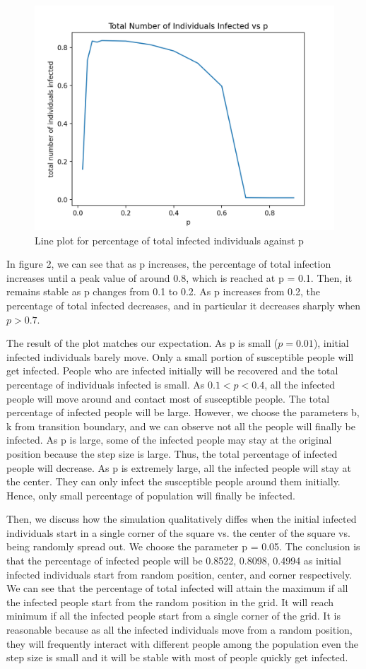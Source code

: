 \documentclass{article}
\begin{document}
\begin{figure}[htp]
\centering
\includegraphics[width=.3\textwidth]{secondspatialplot.png}
\caption{Line plot for percentage of total infected individuals against p}
\label{fig:figure2}

\end{figure}


In figure 2, we can see that as p increases, the percentage of total infection increases until a peak value of around 0.8, which is reached at p = 0.1. Then, it remains stable as p changes from 0.1 to 0.2. As p increases from 0.2, the percentage of total infected decreases, and in particular it decreases sharply when $p > 0.7$.

The result of the plot matches our expectation. As p is small ($p=0.01$), initial infected individuals barely move. Only a small portion of susceptible people will get infected. People who are infected initially will be recovered and the total percentage of individuals infected is small. As $ 0.1<p<0.4 $, all the infected people will move around and contact most of susceptible people. The total percentage of infected people will be large. However, we choose the parameters b, k from transition boundary, and we can observe not all the people will finally be infected. As p is large, some of the infected people may stay at the original position because the step size is large. Thus, the total percentage of infected people will decrease. As p is extremely large, all the infected people will stay at the center. They can only infect the susceptible people around them initially. Hence, only small percentage of population will finally be infected.


Then, we discuss how the simulation qualitatively diffes when the initial infected individuals start in a single corner of the square vs. the center of the square vs. being randomly spread out. We choose the parameter p = 0.05. The conclusion is that the percentage of infected people will be 0.8522, 0.8098, 0.4994 as initial infected individuals start from random position, center, and corner respectively. We can see that the percentage of total infected will attain the maximum if all the infected people start from the random position in the grid. It will reach minimum if all the infected people start from a single corner of the grid. It is reasonable because as all the infected individuals move from a random position, they will frequently interact with different people among the population even the step size is small and it will be stable with most of people quickly get infected.
\end{document}
